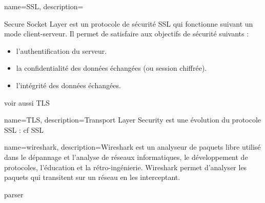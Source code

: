 
{
	name={SSL},
	description={Secure Socket Layer est un protocole de sécurité SSL qui fonctionne suivant un mode client-serveur. Il permet de satisfaire aux objectifs de sécurité suivants :\begin{itemize}
	\item l'authentification du serveur.
	\item la confidentialité des données échangées (ou session chiffrée).
	\item l'intégrité des données échangées.
	\end{itemize}
    voir aussi \gls{TLS}}
}

{
	name={TLS},
	description={Transport Layer Security est une évolution du protocole SSL : cf \gls{SSL}}
}

{
	name={wireshark},
	description={Wireshark est un analyseur de paquets libre utilisé dans le dépannage et l'analyse de réseaux informatiques, le développement de protocoles, l'éducation et la rétro-ingénierie. Wireshark permet d'analyser les paquets qui transitent sur un réseau en les interceptant.}
}






parser
